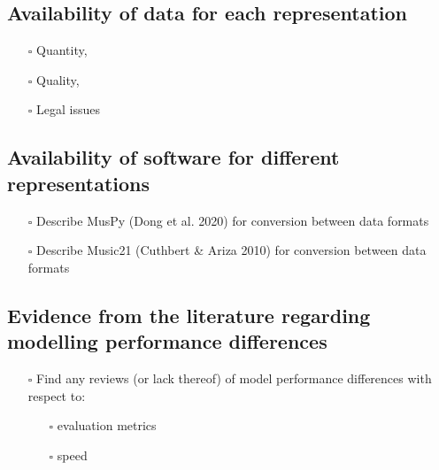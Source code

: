 \documentclass[12pt,a4paper,]{report}
\providecommand{\tightlist}{%
  \setlength{\itemsep}{0pt}\setlength{\parskip}{0pt}}
\begin{document}
\hypertarget{availability-of-data-for-each-representation}{%
\subsection{Availability of data for each
representation}\label{availability-of-data-for-each-representation}}

\begin{itemize}
\tightlist
\item[$\square$]
  Quantity,
\item[$\square$]
  Quality,
\item[$\square$]
  Legal issues
\end{itemize}

\hypertarget{availability-of-software-for-different-representations}{%
\subsection{Availability of software for different
representations}\label{availability-of-software-for-different-representations}}

\begin{itemize}
\tightlist
\item[$\square$]
  Describe MusPy (Dong et al. 2020) for conversion between data formats
\item[$\square$]
  Describe Music21 (Cuthbert \& Ariza 2010) for conversion between data
  formats
\end{itemize}

\hypertarget{evidence-from-the-literature-regarding-modelling-performance-differences}{%
\subsection{Evidence from the literature regarding modelling performance
differences}\label{evidence-from-the-literature-regarding-modelling-performance-differences}}

\begin{itemize}
\tightlist
\item[$\square$]
  Find any reviews (or lack thereof) of model performance differences
  with respect to:

  \begin{itemize}
  \tightlist
  \item[$\square$]
    evaluation metrics
  \item[$\square$]
    speed
  \end{itemize}
\end{itemize}
\end{document}
